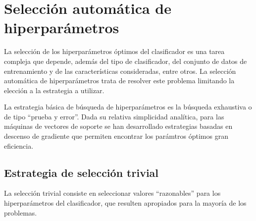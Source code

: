 \documentclass[12pt,bibliography=oldstyle,DIV=12,parskip=half-]{scrreprt}
\begin{document}







%
%
\section{Selección automática de hiperparámetros}
%
La selección de los hiperparámetros óptimos del clasificador es una
tarea compleja que depende, además del tipo de clasificador, del
conjunto de datos de entrenamiento y de las características
consideradas, entre otros.  La selección automática de hiperparámetros
trata de resolver este problema limitando la elección a la estrategia
a utilizar.

La estrategia básica de búsqueda de hiperparámetros es la búsqueda
exhaustiva o de tipo ``prueba y error''. Dada su relativa simplicidad
analítica, para las máquinas de vectores de soporte se han
desarrollado estrategias basadas en descenso de gradiente que permiten
encontrar los parámtros óptimos gran eficiencia.
%
%
\subsection{Estrategia de selección trivial}
%
La selección trivial consiste en seleccionar valores ``razonables''
para los hiperparámetros del clasificador, que resulten apropiados
para la mayoría de los problemas.
\end{document}
